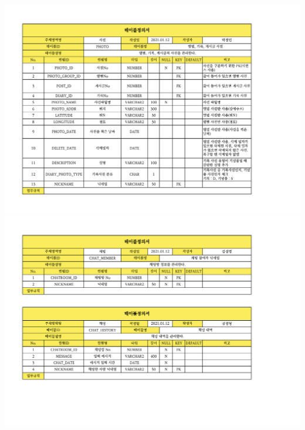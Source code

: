 \begin{landscape}
    {\includegraphics[width=30cm]{./Figure/Design/Display/table/table_10.pdf}} \\
    {\includegraphics[width=30cm]{./Figure/Design/Display/table/table_11.pdf}}
\end{landscape}
